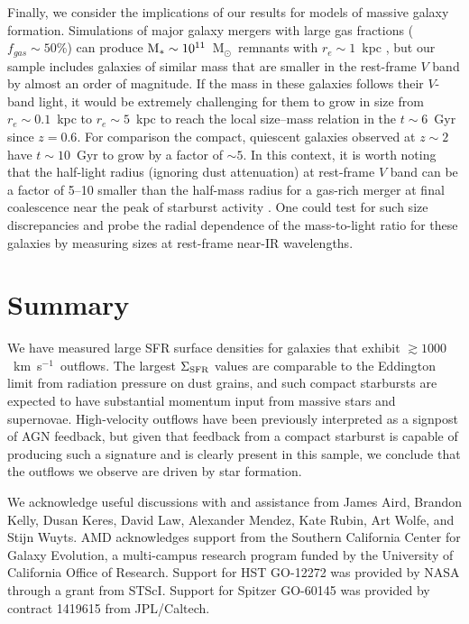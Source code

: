 \documentclass[12pt,preprint]{aastex}
\newcommand{\kms}{km~s$^{-1}$}
\newcommand{\msun}{M$_{\odot}$}
\newcommand{\mstar}{M$_{*}$}
\newcommand{\sigmasfr}{\Sigma_{\textnormal{\scriptsize{SFR}}}}
\begin{document}
Finally, we consider the implications of our results for models of
massive galaxy formation.  Simulations of major galaxy mergers with
large gas fractions ($f_{gas}\sim50$\%) can produce
$\textnormal{\mstar}\sim10^{11}$~\msun\ remnants with $r_{e}\sim1$~kpc
\citep{wuy10}, but our sample includes galaxies of similar mass that
are smaller in the rest-frame $V$ band by almost an order of
magnitude.  If the mass in these galaxies follows their $V$-band
light, it would be extremely challenging for them to grow in size from
$r_e\sim0.1$~kpc to $r_e\sim5$~kpc to reach the local size--mass
relation \citep{she03} in the $t\sim6$~Gyr since $z=0.6$.  For
comparison the compact, quiescent galaxies observed at $z\sim2$
\citep{tru07,van08} have $t\sim10$~Gyr to grow by a factor of $\sim5$.
In this context, it is worth noting that the half-light radius
(ignoring dust attenuation) at rest-frame $V$ band can be a factor of
5--10 smaller than the half-mass radius for a gas-rich merger at final
coalescence near the peak of starburst activity \citep{wuy10}.  One
could test for such size discrepancies and probe the radial dependence
of the mass-to-light ratio for these galaxies by measuring sizes at
rest-frame near-IR wavelengths.

 

\section{Summary}

We have measured large SFR surface densities for galaxies that exhibit
$\gtrsim1000$~\kms\ outflows.  The largest $\sigmasfr$ values are
comparable to the Eddington limit from radiation pressure on dust
grains, and such compact starbursts are expected to have substantial
momentum input from massive stars and supernovae.  High-velocity
outflows have been previously interpreted as a signpost of AGN
feedback, but given that feedback from a compact starburst is capable
of producing such a signature and is clearly present in this sample,
we conclude that the outflows we observe are driven by star formation.


\acknowledgments

We acknowledge useful discussions with and assistance from James Aird,
Brandon Kelly, Dusan Keres, David Law, Alexander Mendez, Kate Rubin,
Art Wolfe, and Stijn Wuyts.  AMD acknowledges support from the
Southern California Center for Galaxy Evolution, a multi-campus
research program funded by the University of California Office of
Research.  Support for HST GO-12272 was provided by NASA through a
grant from STScI.  Support for Spitzer GO-60145 was provided by
contract 1419615 from JPL/Caltech.
\end{document}
